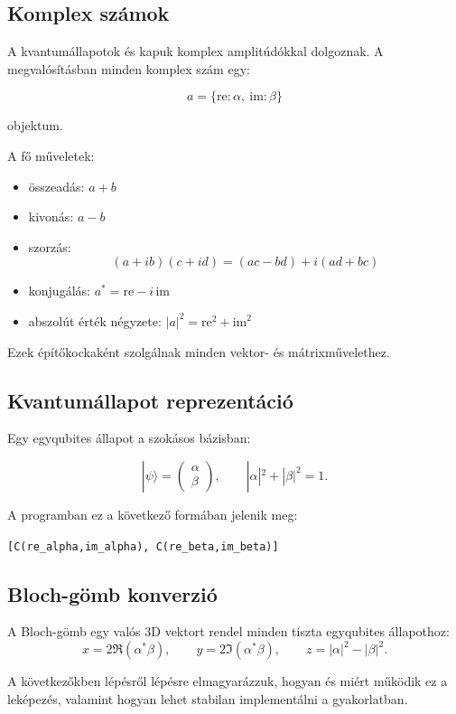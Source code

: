 \documentclass[12pt]{article}
\begin{document}
	\subsection{Komplex számok}
	A kvantumállapotok és kapuk komplex amplitúdókkal dolgoznak.
	A megvalósításban minden komplex szám egy:
	
	\[
	a = \{ \mathrm{re}: \alpha, \ \mathrm{im}: \beta \}
	\]
	
	objektum.
	
	A fő műveletek:
	
	\begin{itemize}
		\item összeadás: \( a + b \)
		\item kivonás: \( a - b \)
		\item szorzás: 
		\[
		(a+ib)(c+id) = (ac - bd) + i(ad + bc)
		\]
		\item konjugálás: \( a^\ast = \mathrm{re} - i\,\mathrm{im} \)
		\item abszolút érték négyzete: \( |a|^2 = \mathrm{re}^2 + \mathrm{im}^2 \)
	\end{itemize}
	
	Ezek építőkockaként szolgálnak minden vektor- és mátrixművelethez.
	
	\subsection{Kvantumállapot reprezentáció}
	Egy egyqubites állapot a szokásos bázisban:
	
	\[
	|\psi\rangle = 
	\begin{pmatrix}
		\alpha \\ \beta
	\end{pmatrix}, 
	\qquad |\alpha|^2 + |\beta|^2 = 1.
	\]
	
	A programban ez a következő formában jelenik meg:
	
	\texttt{[C(re\_alpha,im\_alpha), C(re\_beta,im\_beta)]}
	
	\subsection{Bloch-gömb konverzió}
	A Bloch-gömb egy valós 3D vektort rendel minden tiszta egyqubites állapothoz:
	\[
	x = 2 \Re(\alpha^\ast \beta),\qquad
	y = 2 \Im(\alpha^\ast \beta),\qquad
	z = |\alpha|^2 - |\beta|^2.
	\]
	
	A következőkben lépésről lépésre elmagyarázzuk, hogyan és miért működik ez a leképezés, valamint hogyan lehet stabilan implementálni a gyakorlatban.
	
\end{document}
